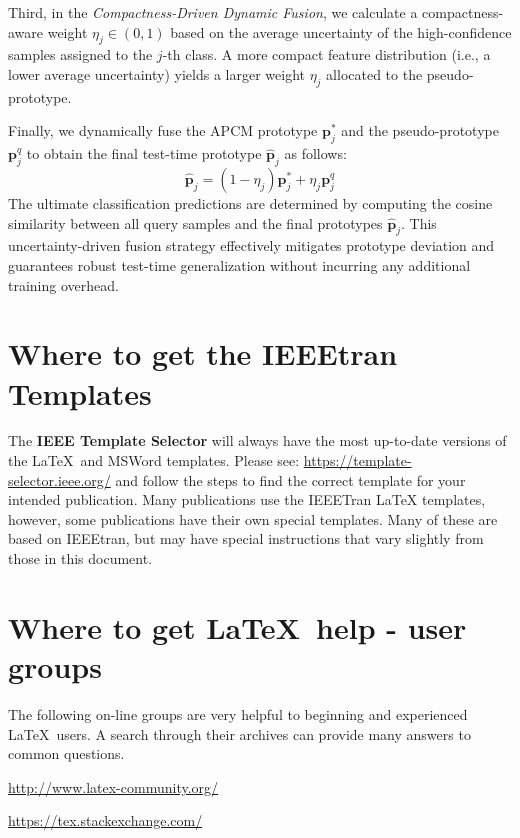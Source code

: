 \documentclass[lettersize,journal]{IEEEtran}
\begin{document}
Third, in the \textit{Compactness-Driven Dynamic Fusion}, we calculate a compactness-aware weight $\eta_j \in (0,1)$ based on the average uncertainty of the high-confidence samples assigned to the $j$-th class. 
A more compact feature distribution (i.e., a lower average uncertainty) yields a larger weight $\eta_j$ allocated to the pseudo-prototype. 

Finally, we dynamically fuse the APCM prototype $\mathbf{p}^*_j$ and the pseudo-prototype $\mathbf{p}^q_j$ to obtain the final test-time prototype $\hat{\mathbf{p}}_j$ as follows:
\begin{equation}
\hat{\mathbf{p}}_j = (1 - \eta_j) \mathbf{p}^*_j + \eta_j \mathbf{p}^q_j
\label{eq_cpf_fusion}
\end{equation}
The ultimate classification predictions are determined by computing the cosine similarity between all query samples and the final prototypes $\hat{\mathbf{p}}_j$.
This uncertainty-driven fusion strategy effectively mitigates prototype deviation and guarantees robust test-time generalization without incurring any additional training overhead.

\section{Where to get the IEEEtran Templates}
\noindent The {\bf{IEEE Template Selector}} will always have the most up-to-date versions of the \LaTeX\ and MSWord templates. Please see: \url{https://template-selector.ieee.org/} and follow the steps to find the correct template for your intended publication. Many publications use the IEEETran LaTeX templates, however, some publications have their own special templates. Many of these are  based on IEEEtran, but may have special instructions that vary slightly from those in this document.

\section{Where to get \LaTeX \ help - user groups}
\noindent The following on-line groups are very helpful to beginning and experienced \LaTeX\ users. A search through their archives can provide many answers to common questions.
\begin{list}{}{}
\item{\url{http://www.latex-community.org/}} 
\item{\url{https://tex.stackexchange.com/} }
\end{list}
\end{document}
